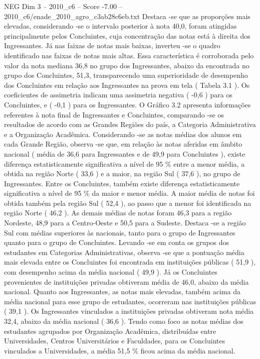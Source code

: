 \begin{textsample}{NEG Dim 3 – 2010\_c6 – Score -7.00 – 2010\_c6/enade\_2010\_agro\_c3ab28c6eb.txt}
Destaca -se que as proporções mais elevadas, considerando -se o intervalo posterior à nota 40,0, foram atingidas principalmente pelos Concluintes, cuja concentração das notas está à direita dos Ingressantes.
Já nas faixas de notas mais baixas, inverteu -se o quadro identificado nas faixas de notas mais altas.
Essa característica é corroborada pelo valor da nota mediana 36,8 no grupo dos Ingressantes, abaixo da encontrada no grupo dos Concluintes, 51,3, transparecendo uma superioridade de desempenho dos Concluintes em relação aos Ingressantes na prova em tela ( Tabela 3.1 ).
Os coeficientes de assimetria indicam uma assimetria negativa ( -0,6 ) para os Concluintes, e ( -0,1 ) para os Ingressantes.
O Gráfico 3.2 apresenta informações referentes à nota final de Ingressantes e Concluintes, comparando -se os resultados de acordo com as Grandes Regiões do país, a Categoria Administrativa e a Organização Acadêmica.
Considerando -se as notas médias dos alunos em cada Grande Região, observa -se que, em relação às notas aferidas em âmbito nacional ( média de 36,6 para Ingressantes e de 49,9 para Concluintes ), existe diferença estatisticamente significativa a nível de 95 \% entre a menor média, a obtida na região Norte ( 33,6 ) e a maior, na região Sul ( 37,6 ), no grupo de Ingressantes.
Entre os Concluintes, também existe diferença estatisticamente significativa a nível de 95 \% da maior e menor média.
A maior média de notas foi obtida também pela região Sul ( 52,4 ), ao passo que a menor foi identificada na região Norte ( 46,2 ).
As demais médias de notas foram 46,3 para a região Nordeste, 48,9 para a Centro-Oeste e 50,5 para a Sudeste.
Destaca -se a região Sul com médias superiores às nacionais, tanto para o grupo de Ingressantes quanto para o grupo de Concluintes.
Levando -se em conta os grupos dos estudantes em Categorias Administrativas, observa -se que a pontuação média mais elevada entre os Concluintes foi encontrada em instituições públicas ( 51,9 ), com desempenho acima da média nacional ( 49,9 ).
Já os Concluintes provenientes de instituições privadas obtiveram média de 46,0, abaixo da média nacional.
Quanto aos Ingressantes, as notas mais elevadas, também acima da média nacional para esse grupo de estudantes, ocorreram nas instituições públicas ( 39,1 ).
Os Ingressantes vinculados a instituições privadas obtiveram nota média 32,4, abaixo da média nacional ( 36,6 ).
Tendo como foco as notas médias dos estudantes agrupados por Organização Acadêmica, distribuídas entre Universidades, Centros Universitários e Faculdades, para os Concluintes vinculados a Universidades, a média 51,5 \% ficou acima da média nacional.

\end{textsample}
